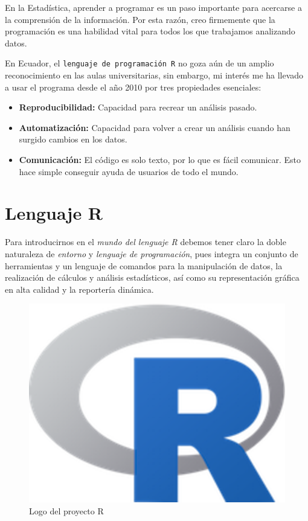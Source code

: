 \documentclass[11pt,a4paper,oneside]{book}\usepackage[]{graphicx}\usepackage[]{color}
\begin{document}
En la Estadística, aprender a programar es un paso importante para acercarse a la comprensión de la información. Por esta razón, creo firmemente que la programación es una habilidad vital para todos los que trabajamos analizando datos.\newline

En Ecuador, el \texttt{lenguaje de programación R} no goza aún de un amplio reconocimiento en las aulas universitarias, sin embargo, mi interés me ha llevado a usar el programa desde el año 2010 por tres propiedades esenciales:
\begin{itemize}
   \item {\bf Reproducibilidad:} Capacidad para recrear un análisis pasado.
   \item {\bf Automatización:} Capacidad para volver a crear un análisis cuando han surgido cambios en los datos.
   \item {\bf Comunicación:} El código es solo texto, por lo que es fácil comunicar. Esto hace simple conseguir ayuda de usuarios de todo el mundo.
\end{itemize}

\section{Lenguaje R}

Para introducirnos en el \emph{mundo del lenguaje R} debemos tener claro la doble naturaleza de \emph{entorno} y \emph{lenguaje de programación}, pues integra un conjunto de herramientas y un lenguaje de comandos para la manipulación de datos, la realización de cálculos y análisis estadísticos, así como su representación gráfica en alta calidad y la reportería dinámica.

\begin{figure}[H]
\centering
\includegraphics[scale=.55]{figuras/logo_r.eps}
\caption{Logo del proyecto R}
\end{figure}
\end{document}

